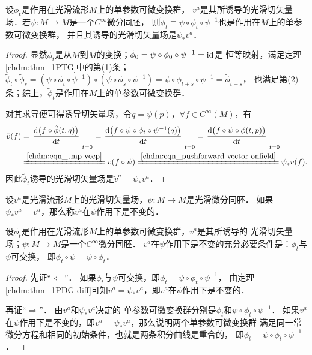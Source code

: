 \begin{theorem}\label{chdm:thm_1PDG-diff}
    设$\phi_t$是作用在光滑流形$M$上的单参数可微变换群，
    $v^a$是其所诱导的光滑切矢量场．若$\psi:M\to M$是一个$C^\infty$微分同胚，
    则$\tilde{\phi}_t \equiv \psi \circ \phi_t \circ \psi^{-1}$也是作用在$M$上的单参数可微变换群，
    并且其诱导的光滑切矢量场是$\psi_{*}v^a$．
\end{theorem}
\begin{proof}
    显然$\tilde{\phi}_t$是从$M$到$M$的变换；$\tilde{\phi}_0=\psi \circ \phi_0 \circ \psi^{-1}={\rm id}$是
    恒等映射，满足定理\ref{chdm:thm_1PTG}中的第(1)条；
    $\tilde{\phi}_t\circ \tilde{\phi}_s =  (\psi \circ \phi_t \circ \psi^{-1} ) \circ 
    (\psi \circ \phi_s \circ \psi^{-1}) = \psi \circ \phi_{t+s} \circ \psi^{-1}=\tilde{\phi}_{t+s}$，
    也满足第(2)条；综上，$\tilde{\phi}_t$是作用在$M$上的单参数可微变换群．
    
    对其求导便可得诱导切矢量场，令$q=\psi(p)$，$\forall f\in C^\infty (M)$，有
    \begin{align*}
        \tilde{v}(f) & = \left. \frac{{\rm d} \bigl(f \circ \tilde{\phi}(t,q)\bigr)}{{\rm d} t} \right |_{t=0}
        =\left. \frac{{\rm d} \bigl(f \circ \psi \circ \phi_t \circ \psi^{-1} (q)\bigr)}{{\rm d} t} \right |_{t=0}
        =\left. \frac{{\rm d} \bigl(f \circ \psi \circ \phi(t,p)\bigr)}{{\rm d} t} \right |_{t=0} \\
        &\xlongequal{\ref{chdm:eqn_tmp-vecp}} v(f \circ \psi)
        \xlongequal{\ref{chdm:eqn_pushforward-vector-onfield}} \psi_{*}v(f) .
    \end{align*}
    因此$\tilde{\phi}_t$诱导的光滑切矢量场是$\tilde{v}^a=\psi_{*}v^a$．
\end{proof}

\begin{definition}\label{chdm:def_invariant-vector-field}
    设$v^a$是光滑流形$M$上的光滑切矢量场，$\psi:M\to M$是光滑微分同胚．
    如果$\psi_{*}v^a=v^a$，那么称$v^a$在$\psi$作用下是不变的．
\end{definition}


\begin{proposition}\label{chdm:thm_ivf}
    设$\phi_t$是作用在光滑流形$M$上的单参数可微变换群，$v^a$是其所诱导的
    光滑切矢量场；$\psi:M\to M$是一个$C^\infty$微分同胚．
    $v^a$在$\psi$作用下是不变的充分必要条件是：$\phi_t$与$\psi$可交换，
    即$\phi_t\circ \psi = \psi \circ \phi_t$．
\end{proposition}
\begin{proof}
    先证“$\Leftarrow$”．
    如果$\phi_t$与$\psi$可交换，即${\phi}_t = \psi \circ \phi_t \circ \psi^{-1}$，
    由定理\ref{chdm:thm_1PDG-diff}可知${v}^a=\psi_{*}v^a$，即$v^a$在$\psi$作用下是不变的．
    
    再证“$\Rightarrow$”．
    由${v}^a$和$\psi_{*}v^a$决定的
    单参数可微变换群分别是${\phi}_t$和$\psi \circ \phi_t \circ \psi^{-1}$．
    如果$v^a$在$\psi$作用下是不变的，即${v}^a=\psi_{*}v^a$，那么说明两个单参数可微变换群
    满足同一常微分方程和相同的初始条件，也就是两条积分曲线是重合的，
    即${\phi}_t = \psi \circ \phi_t \circ \psi^{-1}$．
\end{proof}


